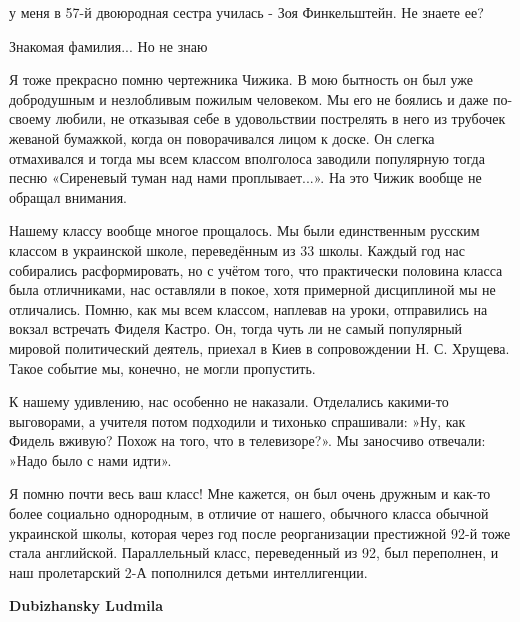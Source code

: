 \begin{itemize}
\begin{itemize} %
у меня в 57-й двоюродная сестра училась - Зоя Финкельштейн. Не знаете ее?

Знакомая фамилия... Но не знаю
\end{itemize} %


Я тоже прекрасно помню чертежника Чижика. В мою бытность он был уже добродушным
и незлобливым пожилым человеком. Мы его не боялись и даже по-своему любили, не
отказывая себе в удовольствии пострелять в него из трубочек жеваной бумажкой,
когда он поворачивался лицом к доске. Он слегка отмахивался и тогда мы всем
классом вполголоса заводили популярную тогда песню «Сиреневый туман над нами
проплывает...». На это Чижик вообще не обращал внимания.

Нашему классу вообще многое прощалось. Мы были единственным русским классом в
украинской школе, переведённым из 33 школы. Каждый год нас собирались
расформировать, но с учётом того, что практически половина класса была
отличниками, нас оставляли в покое, хотя примерной дисциплиной мы не отличались.
Помню, как мы всем классом, наплевав на уроки, отправились на вокзал встречать
Фиделя Кастро. Он, тогда чуть ли не самый популярный мировой политический
деятель, приехал в Киев в сопровождении Н. С. Хрущева. Такое событие мы, конечно,
не могли пропустить.

К нашему удивлению, нас особенно не наказали. Отделались какими-то выговорами, а
учителя потом подходили и тихонько спрашивали: »Ну, как Фидель вживую? Похож на
того, что в телевизоре?». Мы заносчиво отвечали: »Надо было с нами идти».

\begin{itemize} %

Я помню почти весь ваш класс! Мне кажется, он был очень дружным и как-то более
социально однородным, в отличие от нашего, обычного класса обычной украинской
школы, которая через год после реорганизации престижной 92-й тоже стала
английской. Параллельный класс, переведенный из 92, был переполнен, и наш
пролетарский 2-А пополнился детьми интеллигенции.

\end{itemize} %

\textbf{Dubizhansky Ludmila}


\end{itemize}
